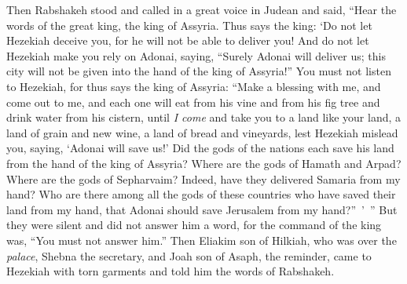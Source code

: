 \begin{biblechapter}
\verse Then Rabshakeh stood and called in a great voice in Judean and said, “Hear the words of the great king, the king of Assyria.
\verse Thus says the king: ‘Do not let Hezekiah deceive you, for he will not be able to deliver you!
\verse And do not let Hezekiah make you rely on Adonai, saying, “Surely Adonai will deliver us; this city will not be given into the hand of the king of Assyria!”
\verse You must not listen to Hezekiah, for thus says the king of Assyria: “Make a blessing with me, and come out to me, and each one will eat from his vine and from his fig tree and drink water from his cistern,
\verse until \textit{I come} and take you to a land like your land, a land of grain and new wine, a land of bread and vineyards,
\verse lest Hezekiah mislead you, saying, ‘Adonai will save us!’ Did the gods of the nations each save his land from the hand of the king of Assyria?
\verse Where are the gods of Hamath and Arpad? Where are the gods of Sepharvaim? Indeed, have they delivered Samaria from my hand?
\verse Who are there among all the gods of these countries who have saved their land from my hand, that Adonai should save Jerusalem from my hand?” ’ ”
\verse But they were silent and did not answer him a word, for the command of the king was, “You must not answer him.”
\verse Then Eliakim son of Hilkiah, who was over the \textit{palace}, Shebna the secretary, and Joah son of Asaph, the reminder, came to Hezekiah with torn garments and told him the words of Rabshakeh.
\end{biblechapter}

